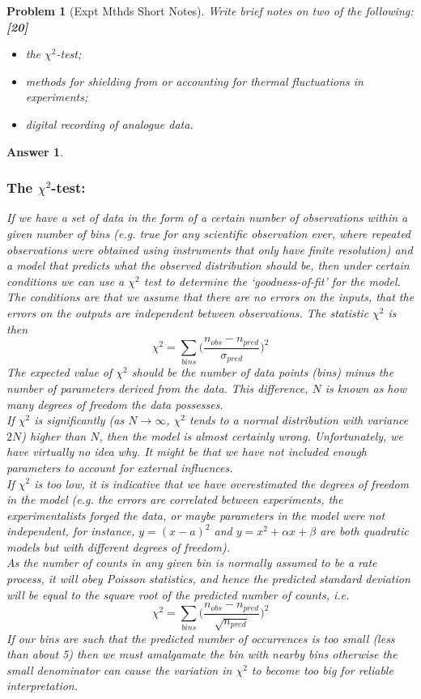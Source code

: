 \documentclass[a4paper]{article}
\newtheorem{ans}{Answer}[subsection]
\theoremstyle{new}
\newtheorem{qns}{Problem}[subsection]
\begin{document}
\newpage
\begin{qns}[Expt Mthds Short Notes]
Write brief notes on two of the following:\hfill\textbf{[20]}
\begin{itemize}
    \item the $\chi^2$-test;
    \item methods for shielding from or accounting for thermal fluctuations in experiments;
    \item digital recording of analogue data.
\end{itemize}
\end{qns}
\begin{ans}\leavevmode
\subsubsection*{The $\chi^2$-test:}
If we have a set of data in the form of a certain number of observations within a given number of bins (e.g. true for any scientific observation ever, where repeated observations were obtained using instruments that only have finite resolution) and a model that predicts what the observed distribution should be, then under certain conditions we can use a $\chi^2$ test to determine the `goodness-of-fit' for the model.\\[5pt]
The conditions are that we assume that there are no errors on the inputs, that the errors on the outputs are independent between observations. The statistic $\chi^2$ is then
$$\chi^2=\sum_{bins}\bigg(\frac{n_{obs}-n_{pred}}{\sigma_{pred}}\bigg)^2$$
The expected value of $\chi^2$ should be the number of data points (bins) minus the number of parameters derived from the data. This difference, $N$ is known as how many degrees of freedom the data possesses.\\[5pt]
If $\chi^2$ is significantly (as $N \rightarrow\infty$, $\chi^2$ tends to a normal distribution with variance $2N$) higher than $N$, then the model is almost certainly wrong. Unfortunately, we have virtually no idea why. It might be that we have not included enough parameters to account for external influences.\\[5pt]
If $\chi^2$ is too low, it is indicative that we have overestimated the degrees of freedom in the model (e.g. the errors are correlated between experiments, the experimentalists forged the data, or maybe parameters in the model were not independent, for instance, $y=(x-a)^2$ and $y=x^2+\alpha x+\beta$ are both quadratic models but with different degrees of freedom).\\[5pt]
As the number of counts in any given bin is normally assumed to be a rate process, it will obey Poisson statistics, and hence the predicted standard deviation will be equal to the square root of the predicted number of counts, i.e.
$$\chi^2=\sum_{bins}\bigg(\frac{n_{obs}-n_{pred}}{\sqrt{n_{pred}}}\bigg)^2$$
If our bins are such that the predicted number of occurrences is too small (less than about 5) then we must amalgamate the bin with nearby bins otherwise the small denominator can cause the variation in $\chi^2$ to become too big for reliable interpretation.

\end{ans}
\end{document}
